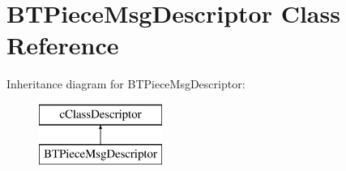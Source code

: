 \hypertarget{classBTPieceMsgDescriptor}{}\section{B\+T\+Piece\+Msg\+Descriptor Class Reference}
\label{classBTPieceMsgDescriptor}
Inheritance diagram for B\+T\+Piece\+Msg\+Descriptor\+:\begin{figure}[H]
\begin{center}
\leavevmode
\includegraphics[height=2.000000cm]{classBTPieceMsgDescriptor}
\end{center}
\end{figure}
